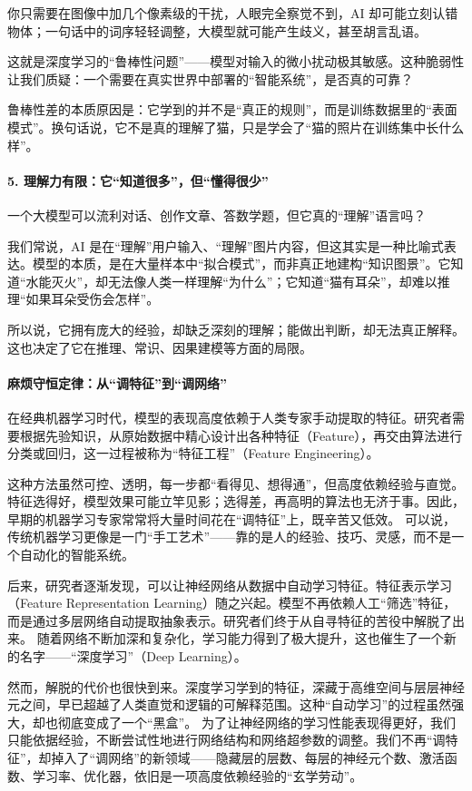 你只需要在图像中加几个像素级的干扰，人眼完全察觉不到，AI 却可能立刻认错物体；一句话中的词序轻轻调整，大模型就可能产生歧义，甚至胡言乱语。

这就是深度学习的“鲁棒性问题”——模型对输入的微小扰动极其敏感。这种脆弱性让我们质疑：一个需要在真实世界中部署的“智能系统”，是否真的可靠？

鲁棒性差的本质原因是：它学到的并不是“真正的规则”，而是训练数据里的“表面模式”。换句话说，它不是真的理解了猫，只是学会了“猫的照片在训练集中长什么样”。

\paragraph*{5. 理解力有限：它“知道很多”，但“懂得很少”}

一个大模型可以流利对话、创作文章、答数学题，但它真的“理解”语言吗？

我们常说，AI 是在“理解”用户输入、“理解”图片内容，但这其实是一种比喻式表达。模型的本质，是在大量样本中“拟合模式”，而非真正地建构“知识图景”。它知道“水能灭火”，却无法像人类一样理解“为什么”；它知道“猫有耳朵”，却难以推理“如果耳朵受伤会怎样”。

所以说，它拥有庞大的经验，却缺乏深刻的理解；能做出判断，却无法真正解释。这也决定了它在推理、常识、因果建模等方面的局限。

\paragraph*{麻烦守恒定律：从“调特征”到“调网络”}
在经典机器学习时代，模型的表现高度依赖于人类专家手动提取的特征。研究者需要根据先验知识，从原始数据中精心设计出各种特征（Feature），再交由算法进行分类或回归，这一过程被称为“特征工程”（Feature Engineering）。

这种方法虽然可控、透明，每一步都“看得见、想得通”，但高度依赖经验与直觉。特征选得好，模型效果可能立竿见影；选得差，再高明的算法也无济于事。因此，早期的机器学习专家常常将大量时间花在“调特征”上，既辛苦又低效。
可以说，传统机器学习更像是一门“手工艺术”——靠的是人的经验、技巧、灵感，而不是一个自动化的智能系统。

后来，研究者逐渐发现，可以让神经网络从数据中自动学习特征。特征表示学习（Feature Representation Learning）随之兴起。模型不再依赖人工“筛选”特征，而是通过多层网络自动提取抽象表示。研究者们终于从自寻特征的苦役中解脱了出来。
随着网络不断加深和复杂化，学习能力得到了极大提升，这也催生了一个新的名字——“深度学习”（Deep Learning）。

然而，解脱的代价也很快到来。深度学习学到的特征，深藏于高维空间与层层神经元之间，早已超越了人类直觉和逻辑的可解释范围。这种“自动学习”的过程虽然强大，却也彻底变成了一个“黑盒”。
为了让神经网络的学习性能表现得更好，我们只能依据经验，不断尝试性地进行网络结构和网络超参数的调整。我们不再“调特征”，却掉入了“调网络”的新领域——隐藏层的层数、每层的神经元个数、激活函数、学习率、优化器，依旧是一项高度依赖经验的“玄学劳动”。

